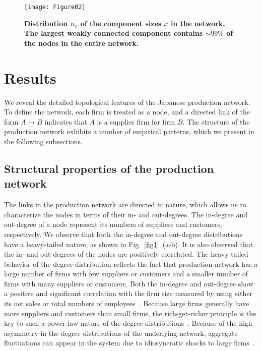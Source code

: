 \documentclass[pre,floatfix,twocolumn,showpacs,a4paper,nofootinbib]{revtex4}
\begin{document}
\begin{figure}[t]
\begin{center}
\texttt{[image: Figure02]}
\end{center}
\caption{
{\bf Distribution $n_x$ of the component sizes $x$ in the network.
The largest weakly connected component contains $\sim 99\%$ of the nodes in the entire network.}
}
\label{fig2}
\end{figure}

\section{Results}
We reveal the detailed topological features of the Japanese production network. To define the network,
each firm is treated as a node, and a directed link of the form $A \rightarrow B$ indicates that $A$ is a supplier firm
for firm $B$. The structure of the production network exhibits a number of empirical patterns, which we present in the following
subsections. 

\subsection{Structural properties of the production network}
The links in the production network are directed in nature, which allows us to characterize the nodes in terms of their in- and out-degrees.
The in-degree and out-degree of a node represent its numbers of suppliers and customers, respectively. We observe that both
the in-degree and out-degree distributions have a heavy-tailed nature, as shown in Fig.~\ref{fig1}~(a-b). 
It is also observed that the in- and out-degrees of the nodes are positively
correlated. 
The heavy-tailed behavior of the degree distribution reflects the fact that production network has
a large number of firms with few suppliers
or customers and a smaller number of firms with many suppliers or customers.
Both the in-degree and out-degree show a positive and significant correlation with the firm size measured by using either its net 
sales or total numbers of employees~\cite{fujiwara2010large}.  Because large firms  generally have more suppliers and customers 
than small firms, the rich-get-richer principle is the key to such a power law nature of the degree distributions~\cite{barabasi1999emergence, chakraborty2010weighted}. Because of the high asymmetry in the degree 
distributions of the underlying network, aggregate fluctuations can appear in the system due to idiosyncratic shocks to large firms~\cite{acemoglu2012network}. 
\end{document}

